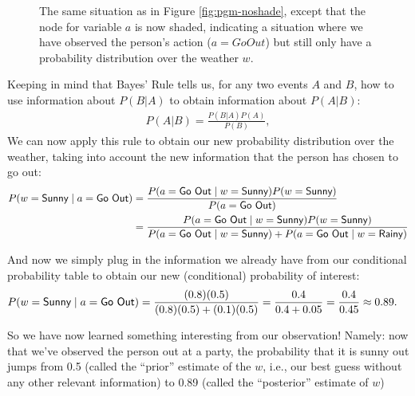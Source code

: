 \begin{figure}[!ht]
	\centering
	\label{fig:pgm-shaded}
	\caption{The same situation as in Figure \ref{fig:pgm-noshade}, except that the node for variable $a$ is now shaded, indicating a situation where we have observed the person’s action ($a = Go Out$) but still only have a probability distribution over the weather $w$.}
\end{figure}

Keeping in mind that Bayes’ Rule tells us, for any two events $A$ and $B$, how to use information about $P(B|A)$ to obtain information about $P(A|B)$:
\begin{align*}
	P(A|B) = \frac{P(B|A)P(A)}{P(B)},
\end{align*}
We can now apply this rule to obtain our new probability distribution over the weather, taking into account the new information that the person has chosen to go out:
\begin{align*}
	P(w = \textsf{Sunny}{} \; | \; a = \textsf{Go Out}{}) &= \frac{P(a = \textsf{Go Out}{} \; | \; w = \textsf{Sunny}{})P(w = \textsf{Sunny}{})}{P(a = \textsf{Go Out}{})} \\
	&= \frac{P(a = \textsf{Go Out}{} \; | \; w = \textsf{Sunny}{})P(w = \textsf{Sunny}{})}{P(a = \textsf{Go Out}{} \; | \; w = \textsf{Sunny}{}) + P(a = \textsf{Go Out}{} \; | \; w = \textsf{Rainy}{})}
\end{align*}

And now we simply plug in the information we already have from our conditional probability table to obtain our new (conditional) probability of interest:
\begin{align*}
	P(w = \textsf{Sunny}{} \; | \; a = \textsf{Go Out}{}) &= \frac{(0.8)(0.5)}{(0.8)(0.5) + (0.1)(0.5)} = \frac{0.4}{0.4 + 0.05} = \frac{0.4}{0.45} \approx 0.89.
\end{align*}

So we have now learned something interesting from our observation! Namely: now that we’ve observed the person out at a party, the probability that it is sunny out jumps from 0.5 (called the “prior” estimate of the $w$, i.e., our best guess without any other relevant information) to 0.89 (called the “posterior” estimate of $w$)

